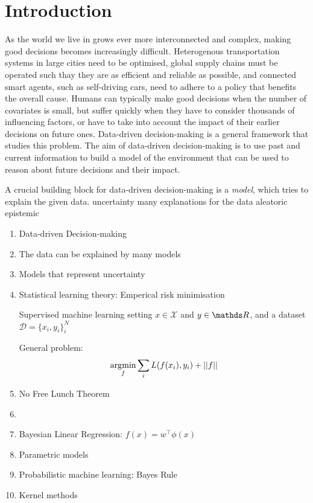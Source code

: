 \chapter{Introduction}  %

As the world we live in grows ever more interconnected and complex, making good decisions becomes increasingly difficult. Heterogenous transportation systems in large cities need to be optimised, global supply chains must be operated such thay they are as efficient and reliable as possible, and connected smart agents, such as self-driving cars, need to adhere to a policy that benefits the overall cause. Humans can typically make good decisions when the number of covariates is small, but suffer quickly when they have to consider thousands of influencing factors, or have to take into account the impact of their earlier decisions on future ones. Data-driven decision-making is a general framework that studies this problem. The aim of data-driven decision-making is to use past and current information to build a model of the environment that can be used to reason about future decisions and their impact.

A crucial building block for data-driven decision-making is a \emph{model}, which tries to explain the given data.
uncertainty
many explanations for the data
aleatoric
epistemic 

\begin{enumerate}
    \item Data-driven Decision-making
    \item The data can be explained by many models
    \item Models that represent uncertainty
    \item Statistical learning theory: Emperical risk minimisation

Supervised machine learning setting
$x \in \mathcal{X}$ and $y \in \Reals$, and a dataset $\mathcal{D} = \{x_i, y_i\}_{i}^N$

General problem:
\begin{equation}
    \operatorname*{\arg\!\min}_{f} \sum_i L(f(x_i), y_i) + \lvert\lvert f\rvert\rvert
\end{equation}

    \item No Free Lunch Theorem
    \item 
    \item Bayesian Linear Regression: $f(x) = w^\top \phi(x)$
    \item Parametric models
    \item Probabilistic machine learning: Bayes Rule
    \item Kernel methods

\end{enumerate}


